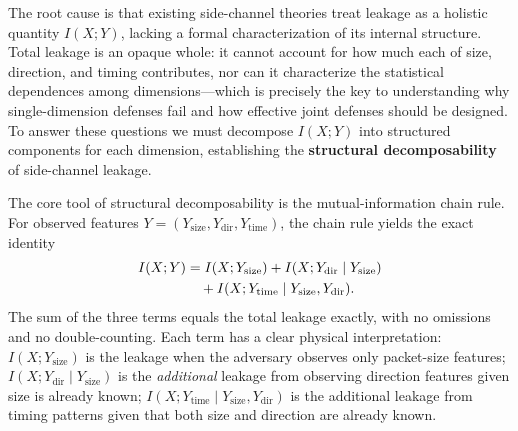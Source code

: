 \documentclass[lettersize,journal]{IEEEtran}
\begin{document}
The root cause is that existing side-channel theories treat leakage as a
holistic quantity $I(X;Y)$, lacking a formal characterization of its
internal structure.
Total leakage is an opaque whole: it cannot account for how much each of
size, direction, and timing contributes, nor can it characterize the
statistical dependences among dimensions---which is precisely the key to
understanding why single-dimension defenses fail and how effective joint
defenses should be designed.
To answer these questions we must decompose $I(X;Y)$ into structured
components for each dimension, establishing the
\textbf{structural decomposability} of side-channel leakage.

The core tool of structural decomposability is the mutual-information
chain rule.
For observed features
$Y=(Y_{\mathrm{size}},Y_{\mathrm{dir}},Y_{\mathrm{time}})$,
the chain rule yields the exact identity
\begin{align}\label{eq:intro-chain}
I(X;Y) &= I(X;Y_{\mathrm{size}})
         + I(X;Y_{\mathrm{dir}}\mid Y_{\mathrm{size}})\notag\\
        &\quad + I(X;Y_{\mathrm{time}} \mid Y_{\mathrm{size}},Y_{\mathrm{dir}}).
\end{align}
The sum of the three terms equals the total leakage exactly, with no
omissions and no double-counting.
Each term has a clear physical interpretation:
$I(X;Y_{\mathrm{size}})$ is the leakage when the adversary observes only
packet-size features;
$I(X;Y_{\mathrm{dir}}\mid Y_{\mathrm{size}})$ is the \emph{additional}
leakage from observing direction features given size is already known;
$I(X;Y_{\mathrm{time}}\mid Y_{\mathrm{size}},Y_{\mathrm{dir}})$ is the
additional leakage from timing patterns given that both size and direction
are already known.
\end{document}
